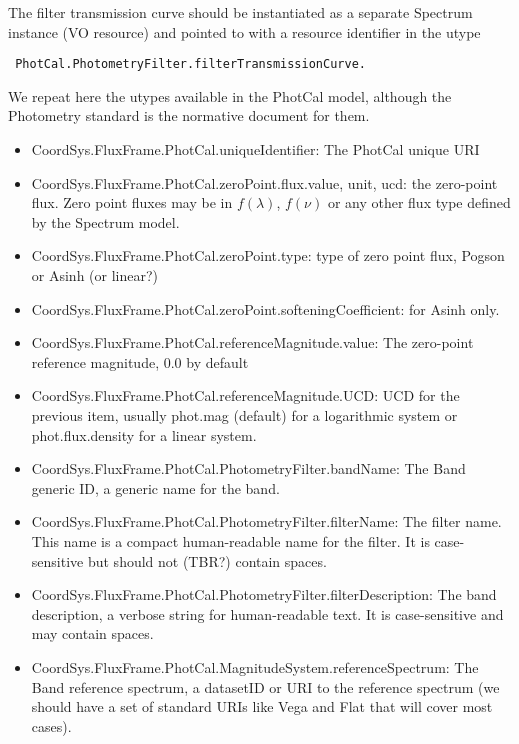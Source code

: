 \documentclass[11pt]{article}
\begin{document}
{The filter transmission curve should be instantiated as a separate Spectrum instance (VO resource)
and pointed to with a resource identifier in the utype
\begin{verbatim} PhotCal.PhotometryFilter.filterTransmissionCurve. \end{verbatim}

We repeat here the utypes available in the PhotCal model, although the Photometry standard is the normative
document for them.

\begin{itemize}
\item CoordSys.FluxFrame.PhotCal.uniqueIdentifier:  The PhotCal unique URI

\item CoordSys.FluxFrame.PhotCal.zeroPoint.flux.value, unit, ucd:  the zero-point flux.
Zero point fluxes may be in $f(\lambda)$, $f(\nu)$ or any other flux type defined
by the Spectrum model.

\item CoordSys.FluxFrame.PhotCal.zeroPoint.type:  type of zero point flux, Pogson or Asinh (or linear?)

\item CoordSys.FluxFrame.PhotCal.zeroPoint.softeningCoefficient: for Asinh only. 

\item CoordSys.FluxFrame.PhotCal.referenceMagnitude.value: The zero-point reference magnitude, 0.0 by default

\item CoordSys.FluxFrame.PhotCal.referenceMagnitude.UCD: UCD for the previous item, usually phot.mag (default)
for a logarithmic system
or phot.flux.density for a linear system.

\item CoordSys.FluxFrame.PhotCal.PhotometryFilter.bandName:
The Band generic ID, a generic name for the band.

\item CoordSys.FluxFrame.PhotCal.PhotometryFilter.filterName:  The filter name.
This name is a compact human-readable name for the filter. It is case-sensitive but should not (TBR?) contain spaces.

\item CoordSys.FluxFrame.PhotCal.PhotometryFilter.filterDescription: The band description, a verbose
string for human-readable text.
It is case-sensitive and may contain spaces.

\item CoordSys.FluxFrame.PhotCal.MagnitudeSystem.referenceSpectrum: The Band reference spectrum, a
datasetID or URI to the reference spectrum
(we should have a set of standard URIs like Vega and Flat that will cover
most cases).


\end{itemize}}
\end{document}
